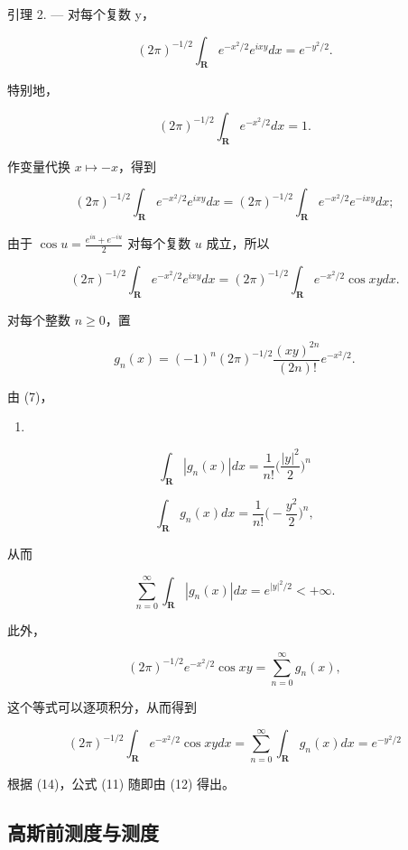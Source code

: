 引理 2. --- 对每个复数 y，

\[
(2 \pi) ^ {- 1 / 2} \int_ {\mathbf {R}} e ^ {- x ^ {2} / 2} e ^ {i x y} d x = e ^ {- y ^ {2} / 2}.\tag{11}
\]

特别地，

\[
(2 \pi) ^ {- 1 / 2} \int_ {\mathbf {R}} e ^ {- x ^ {2} / 2} d x = 1.
\]

作变量代换 \(x \mapsto -x\)，得到

\[
(2 \pi) ^ {- 1 / 2} \int_ {\mathbf {R}} e ^ {- x ^ {2} / 2} e ^ {i x y} d x = (2 \pi) ^ {- 1 / 2} \int_ {\mathbf {R}} e ^ {- x ^ {2} / 2} e ^ {- i x y} d x;
\]

由于 \(\cos u = \frac{e^{iu} + e^{-iu}}{2}\) 对每个复数 \(u\) 成立，所以

\[
(2 \pi) ^ {- 1 / 2} \int_ {\mathbf {R}} e ^ {- x ^ {2} / 2} e ^ {i x y} d x = (2 \pi) ^ {- 1 / 2} \int_ {\mathbf {R}} e ^ {- x ^ {2} / 2} \cos x y d x.\tag{12}
\]

对每个整数 \(n \geqslant 0\)，置

\[
g _ {n} (x) = (- 1) ^ {n} (2 \pi) ^ {- 1 / 2} \frac {(x y) ^ {2 n}}{(2 n) !} e ^ {- x ^ {2} / 2}.
\]

由 (7)，

\begin{enumerate}
\def\labelenumi{(\arabic{enumi})}
\setcounter{enumi}{12}
\tightlist
\item
\end{enumerate}

\[
\int_ {\mathbf {R}} | g _ {n} (x) | d x = \frac {1}{n !} \biggl (\frac {| y | ^ {2}}{2} \biggr) ^ {n}\tag{14}
\]

\[
\int_ {\mathbf {R}} g _ {n} (x) d x = \frac {1}{n !} \Big (- \frac {y ^ {2}}{2} \Big) ^ {n},
\]

从而

\[
\sum_ {n = 0} ^ {\infty} \int_ {\mathbf {R}} | g _ {n} (x) | d x = e ^ {| y | ^ {2} / 2} <   + \infty .
\]

此外，

\[
(2 \pi) ^ {- 1 / 2} e ^ {- x ^ {2} / 2} \cos x y = \sum_ {n = 0} ^ {\infty} g _ {n} (x),
\]

这个等式可以逐项积分，从而得到

\[
(2 \pi) ^ {- 1 / 2} \int_ {\mathbf {R}} e ^ {- x ^ {2} / 2} \cos x y d x = \sum_ {n = 0} ^ {\infty} \int_ {\mathbf {R}} g _ {n} (x) d x = e ^ {- y ^ {2} / 2}
\]

根据 (14)，公式 (11) 随即由 (12) 得出。

\subsection{高斯前测度与测度}

